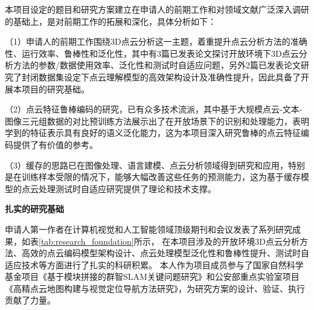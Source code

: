 \documentclass[12pt]{article}
\newcommand{\myEmph}[1]{\textbf{\textcolor[rgb]{0,0,0.25}{#1}}}
\begin{document}
本项目设定的题目和研究方案建立在申请人的前期工作和对领域文献广泛深入调研的基础上，是对前期工作的拓展和深化，具体分析如下：

（1）申请人的前期工作围绕3D点云分析这一主题，着重提升点云分析方法的准确性、运行效率、鲁棒性和泛化性，其中有3篇已发表论文探讨开放环境下3D点云分析方法的参数/数据使用效率、泛化性和测试时自适应问题，另外2篇已发表论文研究了封闭数据集设定下点云理解模型的高效架构设计及准确性提升，因此具备了开展本项目的研究基础。

（2）点云特征鲁棒编码的研究，已有众多技术流派，其中基于大规模点云-文本-图像三元组数据的对比预训练方法展示出了在开放场景下的识别和处理能力，表明学到的特征表示具有良好的语义泛化能力，这为本项目深入研究鲁棒的点云特征编码提供了有价值的参考。

（3）缓存的思路已在图像处理、语言建模、点云分析领域得到研究和应用，特别是在训练样本受限的情况下，能够大幅改善这些任务的预测能力，这为基于缓存模型的点云处理测试时自适应研究提供了理论和技术支撑。

\myEmph{扎实的研究基础}

申请人第一作者在计算机视觉和人工智能领域顶级期刊和会议发表了系列研究成果，如表\ref{tab:research_foundation}所示，
在本项目涉及的开放环境3D点云分析方法、高效的点云编码模型架构设计、点云处理模型泛化性和鲁棒性提升、测试时自适应技术等方面进行了扎实的科研积累。
本人作为项目成员参与了国家自然科学基金项目《基于模块拼接的群智SLAM关键问题研究》和公安部重点实验室项目《高精点云地图构建与视觉定位导航方法研究》，为研究方案的设计、验证、执行贡献了力量。
\end{document}
